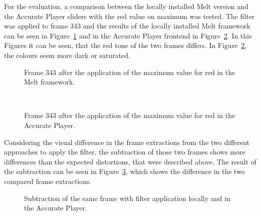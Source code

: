 \documentclass[../MasterThesis.tex]{subfiles}
\begin{document}
For the evaluation, a comparison between the locally installed Melt version and the Accurate Player sliders with the red value on maximum was tested. The filter was applied to frame 343 and the results of the locally installed Melt framework can be seen in Figure~\ref{figure:redMelt} and in the Accurate Player frontend in Figure~\ref{figure:redAP}. In this Figures it can be seen, that the red tone of the two frames differs. In Figure~\ref{figure:redAP}, the colours seem more dark or saturated.


\begin{minipage}{0.48\textwidth}
	
	\begin{figure}[H]
		\begin{center}
			\caption[Frame 343 after the application of the red filter in the Melt framework.]{Frame 343 after the application of the maximum value for red in the Melt framework.}
			\label{figure:redMelt}
		\end{center}
	\end{figure}
\end{minipage}\begin{minipage}{0.04\textwidth}
	\ 
\end{minipage}\begin{minipage}{0.48\textwidth}
	
	\begin{figure}[H]
		\begin{center}
			\caption[Frame 343 after the application of the red filter in the Accurate Player.]{Frame 343 after the application of the maximum value for red in the Accurate Player.}
			\label{figure:redAP}
		\end{center}
	\end{figure}
\end{minipage}

\vspace*{2em}
Considering the visual difference in the frame extractions from the two different approaches to apply the filter, the subtraction of those two frames shows more differences than the expected distortions, that were described above. The result of the subtraction can be seen in Figure~\ref{figure:filterVSfilter}, which shows the difference in the two compared frame extractions.


\begin{figure}[H]
	\begin{center}
		\caption[Subtraction of the two different frames (Melt and Accurate Player).]{Subtraction of the same frame with filter application locally and in the Accurate Player.}
		\label{figure:filterVSfilter}
	\end{center}
\end{figure}
\end{document}
